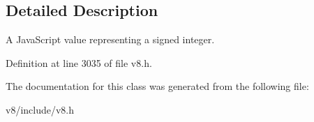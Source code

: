 \subsection{Detailed Description}
A Java\+Script value representing a signed integer. 

Definition at line 3035 of file v8.\+h.



The documentation for this class was generated from the following file\+:\begin{DoxyCompactItemize}
\item 
v8/include/v8.\+h\end{DoxyCompactItemize}
